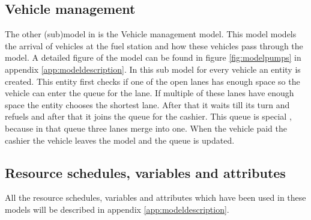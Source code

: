 \subsection{Vehicle management}
The other (sub)model in is the Vehicle management model. This model models the arrival of vehicles at the fuel station and how these vehicles pass through the model. A detailed figure of the model can be found in figure \ref{fig:modelpumps} in appendix \ref{app:modeldescription}. In this sub model for every vehicle an entity is created. This entity first checks if one of the open lanes has enough space so the vehicle can enter the queue for the lane. If multiple of these lanes have enough space the entity chooses the shortest lane. After that it waits till its turn and refuels and after that it joins the queue for the cashier. This queue is special , because in that queue three lanes merge into one. When the vehicle paid the cashier the vehicle leaves the model and the queue is updated. 

\subsection{Resource schedules, variables and attributes}
All the resource schedules, variables and attributes which have been used in these models will be described in appendix  \ref{app:modeldescription}.